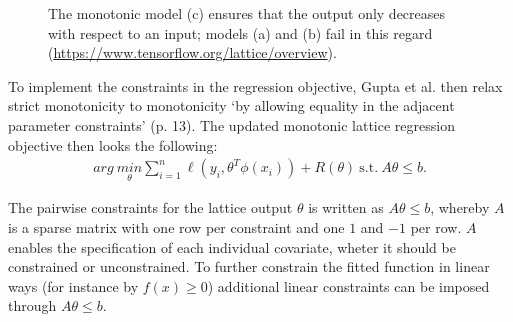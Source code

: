 \begin{figure}[htb]%
	\centering
	\hspace{0.7cm}
	\hspace{0.7cm}
	\caption{The monotonic model (c) ensures that the output only decreases with respect to an input; models (a) and (b) fail in this regard (\url{https://www.tensorflow.org/lattice/overview}).}%
	\label{Fig:mon1}%
\end{figure}

To implement the constraints in the regression objective, Gupta et al. then relax strict monotonicity to monotonicity `by allowing equality in the adjacent parameter constraints' (p. 13). The updated monotonic lattice regression objective then looks the following:
\begin{align}
arg\ \underset{\theta}{min} \sum_{i = 1}^{n} \ell(y_i, \theta^T \phi(x_i)) + R(\theta)\ \mathrm{s.t.}\ A\theta \leq b.
\label{Eq:monlatreg}
\end{align}

The pairwise constraints for the lattice output $\theta$ is written as $A\theta \leq b$, whereby $A$ is a sparse matrix with one row per constraint and one $1$ and $-1$ per row. $A$ enables the specification of each individual covariate, wheter it should be constrained or unconstrained. To further constrain the fitted function in linear ways (for instance by $f(x) \geq 0$) additional linear constraints can be imposed through $A\theta \leq b$.

